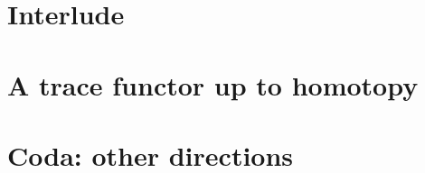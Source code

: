 \documentclass[12pt]{nuthesis} %
\theoremstyle{definition}
\theoremstyle{remark}
\theoremstyle{example}
\begin{document}
\chapter{Interlude} \label{chap:interlude}
	
	

\chapter{A trace functor up to homotopy} \label{chap:trace_up_to_homotopy}
	
	
	
	
	

\chapter{Coda: other directions} \label{chap:coda}
	

\begin{singlespace}
\clearpage{} %

\end{singlespace}

\appendix		%




\end{document}
